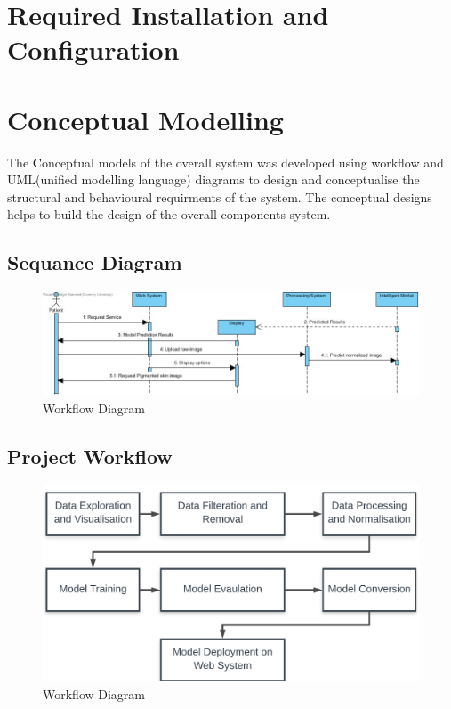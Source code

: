\section{Required Installation and Configuration}

\pagebreak
\section{Conceptual Modelling}
The Conceptual models of the overall system was developed using workflow 
and UML(unified modelling language) diagrams to design and conceptualise
the structural and behavioural requirments of the system. The conceptual designs 
helps to build the design of the overall components system.
\subsection{Sequance Diagram}
\begin{figure}[!htp]
    \centering
    \includegraphics{Images/Sequance.jpg}
    \caption{Workflow Diagram}
    \label{figure:workflow}
\end{figure}


\subsection{Project Workflow}
\begin{figure}[!htp]
    \centering
    \includegraphics[width=\textwidth]{Images/worflow.png}
    \caption{Workflow Diagram}
    \label{figure:workflow}
\end{figure}

